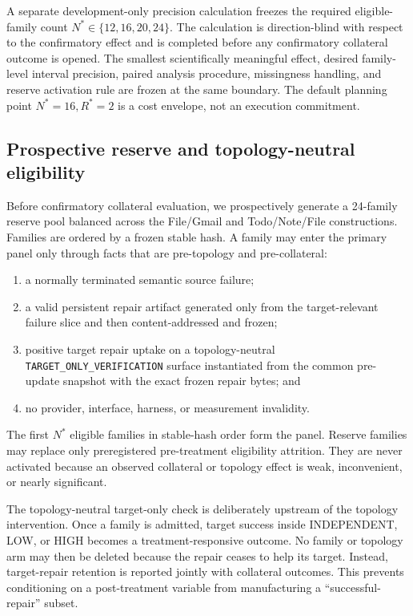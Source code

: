 \documentclass{article}
\begin{document}
A separate development-only precision calculation freezes the required eligible-family count $N^*\in\{12,16,20,24\}$. The calculation is direction-blind with respect to the confirmatory effect and is completed before any confirmatory collateral outcome is opened. The smallest scientifically meaningful effect, desired family-level interval precision, paired analysis procedure, missingness handling, and reserve activation rule are frozen at the same boundary. The default planning point $N^*=16,R^*=2$ is a cost envelope, not an execution commitment.

\subsection{Prospective reserve and topology-neutral eligibility}
Before confirmatory collateral evaluation, we prospectively generate a 24-family reserve pool balanced across the File/Gmail and Todo/Note/File constructions. Families are ordered by a frozen stable hash. A family may enter the primary panel only through facts that are pre-topology and pre-collateral:
\begin{enumerate}
 \item a normally terminated semantic source failure;
 \item a valid persistent repair artifact generated only from the target-relevant failure slice and then content-addressed and frozen;
 \item positive target repair uptake on a topology-neutral \texttt{TARGET\_ONLY\_VERIFICATION} surface instantiated from the common pre-update snapshot with the exact frozen repair bytes; and
 \item no provider, interface, harness, or measurement invalidity.
\end{enumerate}
The first $N^*$ eligible families in stable-hash order form the panel. Reserve families may replace only preregistered pre-treatment eligibility attrition. They are never activated because an observed collateral or topology effect is weak, inconvenient, or nearly significant.

The topology-neutral target-only check is deliberately upstream of the topology intervention. Once a family is admitted, target success inside INDEPENDENT, LOW, or HIGH becomes a treatment-responsive outcome. No family or topology arm may then be deleted because the repair ceases to help its target. Instead, target-repair retention is reported jointly with collateral outcomes. This prevents conditioning on a post-treatment variable from manufacturing a ``successful-repair'' subset.
\end{document}
